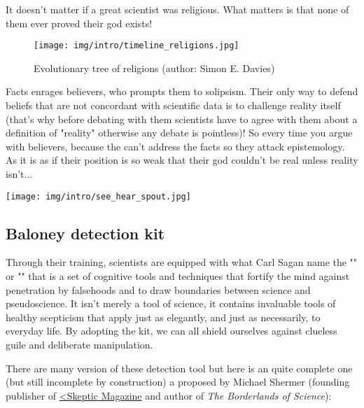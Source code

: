 	\begin{fquote}It doesn't matter if a great scientist was religious. What matters is that none of them ever proved their god exists!
 	\end{fquote}
 	
 	
 	\begin{figure}[H]
		\centering
		\texttt{[image: img/intro/timeline\_religions.jpg]}
		\caption[Evolutionary tree of religions]{Evolutionary tree of religions (author: Simon E. Davies)}
	\end{figure} 
	Facts enrages believers, who prompts them to solipsism. Their only way to defend beliefs that are not concordant with scientific data is to challenge reality itself (that's why before debating with them scientists have to agree with them about a definition of "reality" otherwise any debate is pointless)! So every time you argue with believers, because the can't address the facts so they attack epistemology. As it is as if their position is so weak that their god couldn't be real unless reality isn't...
	
	\begin{center}
		\texttt{[image: img/intro/see\_hear\_spout.jpg]}
	\end{center}
	
	
	\pagebreak
	\subsection{Baloney detection kit}
	Through their training, scientists are equipped with what Carl Sagan name the "" or "" that is a set of cognitive tools and techniques that fortify the mind against penetration by falsehoods and to draw boundaries between science and pseudoscience. It isn't merely a tool of science, it contains invaluable tools of healthy scepticism that apply just as elegantly, and just as necessarily, to everyday life. By adopting the kit, we can all shield ourselves against clueless guile and deliberate manipulation. 

	There are many version of these detection tool but here is an quite complete one (but still incomplete by construction) a proposed by Michael Shermer (founding publisher of \href{http://www.skeptic.com}{<Skeptic Magazine} and author of \textit{The Borderlands of Science}):
	
